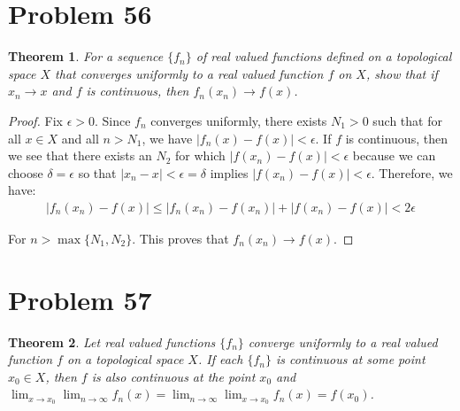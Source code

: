 \documentclass[psamsfonts]{amsart}
\newtheorem{thm}{Theorem}[section]
\theoremstyle{definition}
\theoremstyle{remark}
\numberwithin{equation}{section}
\begin{document}
\section{Problem 56}

\begin{thm}
For a sequence $\{ f_n \}$ of real valued functions defined on a topological space $X$ that converges uniformly to a real valued function $f$ on $X$, show that if $x_n \to x$ and $f$ is continuous, then $f_n(x_n) \to f(x)$. 
\end{thm}

\begin{proof}
Fix $\epsilon > 0$. Since $f_n$ converges uniformly, there exists $N_1>0$ such that for all $x \in X$ and all $n > N_1$, we have $|f_n(x) - f(x) | < \epsilon$. If $f$ is continuous, then we see that there exists an $N_2$ for which $|f(x_n) - f(x) | < \epsilon$ because we can choose $\delta = \epsilon$ so that $|x_n - x| < \epsilon = \delta$ implies $|f(x_n) - f(x) | < \epsilon$. Therefore, we have:
\begin{eqnarray}
|f_n(x_n) - f(x)| \leq |f_n(x_n) - f(x_n)| + |f(x_n) - f(x)| < 2\epsilon
\end{eqnarray}

For $n > \max\{N_1,N_2 \}$. This proves that $f_n(x_n) \to f(x)$. 
\end{proof}

\section{Problem 57}

\begin{thm}
Let real valued functions $\{f_n \}$ converge uniformly to a real valued function $f$ on a topological space $X$. If each $\{ f_n \}$ is continuous at some point $x_0 \in X$, then $f$ is also continuous at the point $x_0$ and $\lim_{x \to x_0} \lim_{n \to \infty} f_n(x) = \lim_{n \to \infty} \lim_{x \to x_0} f_n(x) = f(x_0)$. 
\end{thm}
\end{document}
